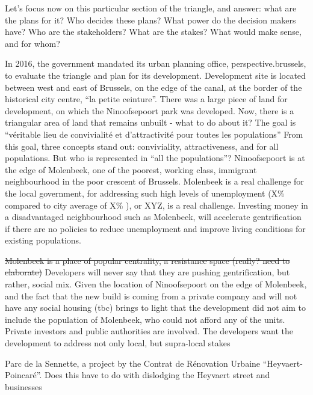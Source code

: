 \documentclass{article}[11pt]
\begin{document}
Let's focus now on this particular section of the triangle, and answer: what are the plans for it? Who decides these plans? What power do the decision makers have? Who are the stakeholders? What are the stakes? What would make sense, and for whom?

In 2016, the government mandated its urban planning office, perspective.brussels, to evaluate the triangle and plan for its development\parencite{required}.
Development site is located between west and east of Brussels, on the edge of the canal, at the border of the historical city centre, ``la petite ceinture''.
There was a large piece of land for development, on which the Ninoofsepoort park was developed. 
Now, there is a triangular area of land that remains unbuilt - what to do about it? The goal is ``véritable lieu de convivialité et d’attractivité pour toutes les populations'' \parencite{perspectiveNinove}
From this goal, three concepts stand out: conviviality, attractiveness, and for all populations. But who is represented in ``all the populations''? Ninoofsepoort is at the edge of Molenbeek, one of the poorest, working class, immigrant neighbourhood in the poor crescent of Brussels. Molenbeek is a real challenge for the local government, for addressing such high levels of unemployment (X\% compared to city average of X\% \parencite{monitoring2020quartier}), or XYZ, is a real challenge. 
Investing money in a disadvantaged neighbourhood such as Molenbeek, will accelerate gentrification if there are no policies to reduce unemployment and improve living conditions for existing populations.

\sout{Molenbeek is a place of popular centrality, a resistance space (really? need to elaborate)}
Developers will never say that they are pushing gentrification, but rather, social mix. Given the location of Ninoofsepoort on the edge of Molenbeek, and the fact that the new build is coming from a private company and will not have any social housing (tbc) brings to light that the development did not aim to include the population of Molenbeek, who could not afford any of the units. 
Private investors and public authorities are involved.
The developers want the development to address not only local, but supra-local stakes

Parc de la Sennette, a project by the Contrat de Rénovation Urbaine ``Heyvaert-Poincaré''. Does this have to do with dislodging the Heyvaert street and businesses
\end{document}
